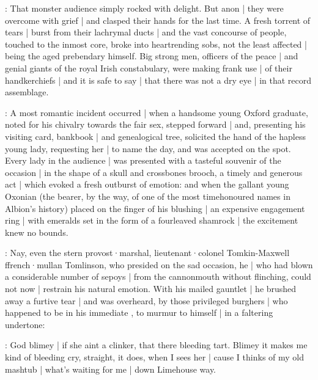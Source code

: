 :
That monster audience simply rocked with delight.
But anon |
they were overcome with grief |
and clasped their hands for the last time.
A fresh torrent of tears |
burst from their lachrymal ducts |
and the vast concourse of people,
touched to the inmost core,
broke into heartrending sobs,
not the least affected |
being the aged prebendary himself.
Big strong men,
officers of the peace |
and genial giants of the royal Irish constabulary,
were making frank use |
of their handkerchiefs |
and it is safe to say |
that there was not a dry eye |
in that record assemblage.

:
A most romantic incident occurred |
when a handsome young Oxford graduate,
noted for his chivalry towards the fair sex,
stepped forward |
and,
presenting his visiting card,
bankbook |
and genealogical tree,
solicited the hand of the hapless young lady,
requesting her |
to name the day,
and was accepted on the spot.
Every lady in the audience |
was presented with a tasteful souvenir of the occasion |
in the shape of a skull and crossbones brooch,
a timely and generous act |
which evoked a fresh outburst of emotion:
and when the gallant young Oxonian
(the bearer,
by the way,
of one of the most timehonoured names in Albion's history)
placed on the finger of his blushing  |
an expensive engagement ring |
with emeralds set in the form of a fourleaved shamrock |
the excitement knew no bounds.

:
Nay,
even the stern provost·marshal,
lieutenant·colonel Tomkin-Maxwell ffrench·mullan Tomlinson,
who presided on the sad occasion,
he |
who had blown a considerable number of sepoys |
from the cannonmouth without flinching,
could not now |
restrain his natural emotion.
With his mailed gauntlet |
he brushed away a furtive tear |
and was overheard,
by those privileged burghers |
who happened to be in his immediate ,
to murmur to himself |
in a faltering undertone:

\tomlinson:
God blimey |
if she aint a clinker,
that there bleeding tart.
Blimey it makes me kind of bleeding cry,
straight,
it does,
when I sees her |
cause I thinks of my old mashtub |
what's waiting for me |
down Limehouse way.

